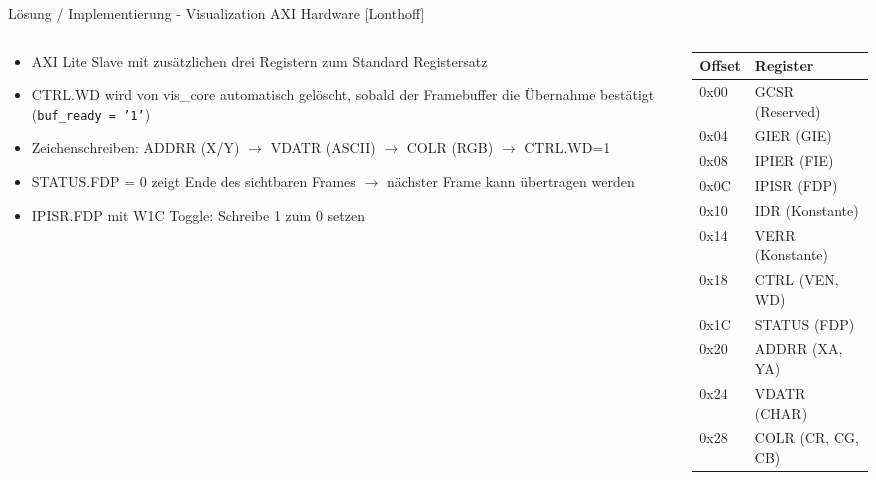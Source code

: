 \begin{frame}{Lösung / Implementierung - Visualization AXI Hardware [Lonthoff]}
    \begin{columns}[T]
        \begin{column}{0.65\textwidth}
            \begin{itemize}
                \item AXI Lite Slave mit zusätzlichen drei Registern zum Standard Registersatz
                \item CTRL.WD wird von vis\_core automatisch gelöscht, sobald der Framebuffer die Übernahme bestätigt (\texttt{buf\_ready = '1'})
                \item Zeichenschreiben: ADDRR (X/Y) $\to$ VDATR (ASCII) $\to$ COLR (RGB) $\to$ CTRL.WD=1
                \item STATUS.FDP = 0 zeigt Ende des sichtbaren Frames $\to$ nächster Frame kann übertragen werden
                \item IPISR.FDP mit W1C Toggle: Schreibe 1 zum 0 setzen
            \end{itemize}
        \end{column}
        \begin{column}{0.35\textwidth}
            \centering
            \footnotesize
            \begin{tabular}{ll}
                \toprule
                \textbf{Offset} & \textbf{Register} \\
                \midrule
                0x00 & GCSR (Reserved) \\
                0x04 & GIER (GIE) \\
                0x08 & IPIER (FIE) \\
                0x0C & IPISR (FDP) \\
                0x10 & IDR (Konstante) \\
                0x14 & VERR (Konstante) \\
                0x18 & CTRL (VEN, WD) \\
                0x1C & STATUS (FDP) \\
                0x20 & ADDRR (XA, YA) \\
                0x24 & VDATR (CHAR) \\
                0x28 & COLR (CR, CG, CB) \\
                \bottomrule
            \end{tabular}
        \end{column}
    \end{columns}
\end{frame}
